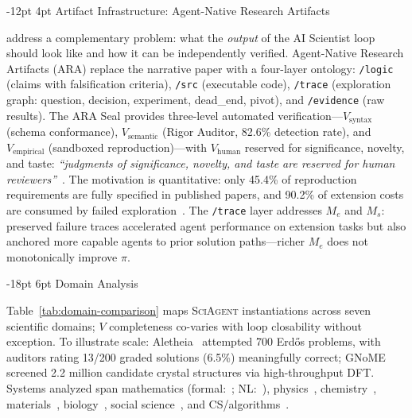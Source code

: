\documentclass[11pt]{article}
\makeatletter
\renewcommand\section{\@startsection{section}{1}{\z@}%
  {-18pt \@plus -4pt \@minus -2pt}%
  {6pt \@plus 2pt}%
  {\normalfont\large\bfseries}}
\renewcommand\subsection{\@startsection{subsection}{2}{\z@}%
  {-12pt \@plus -2pt \@minus -2pt}%
  {4pt \@plus 1pt}%
  {\normalfont\normalsize\bfseries}}
\newcommand{\framework}{\textsc{SciAgent}}
\makeatother
\begin{document}
\subsection{Artifact Infrastructure: Agent-Native Research Artifacts}
\label{sec:ara}

\citet{liu2026lasthuman} address a complementary problem: what the \emph{output} of the AI Scientist loop should look like and how it can be independently verified. Agent-Native Research Artifacts (ARA) replace the narrative paper with a four-layer ontology: \texttt{/logic} (claims with falsification criteria), \texttt{/src} (executable code), \texttt{/trace} (exploration graph: question, decision, experiment, dead\_end, pivot), and \texttt{/evidence} (raw results). The ARA Seal provides three-level automated verification---$V_\text{syntax}$ (schema conformance), $V_\text{semantic}$ (Rigor Auditor, 82.6\% detection rate), and $V_\text{empirical}$ (sandboxed reproduction)---with $V_\text{human}$ reserved for significance, novelty, and taste: \textit{``judgments of significance, novelty, and taste are reserved for human reviewers''}~\citep{liu2026lasthuman}. The motivation is quantitative: only 45.4\% of reproduction requirements are fully specified in published papers, and 90.2\% of extension costs are consumed by failed exploration~\citep{liu2026lasthuman}. The \texttt{/trace} layer addresses $M_e$ and $M_s$: preserved failure traces accelerated agent performance on extension tasks but also anchored more capable agents to prior solution paths---richer $M_e$ does not monotonically improve $\pi$.

\section{Domain Analysis}
\label{sec:domains}

Table~\ref{tab:domain-comparison} maps \framework{} instantiations across seven scientific domains; $V$ completeness co-varies with loop closability without exception. To illustrate scale: Aletheia~\citep{google2026aletheia} attempted 700 Erd\H{o}s problems, with auditors rating 13/200 graded solutions (6.5\%) meaningfully correct; GNoME~\citep{merchant2023gnome} screened 2.2 million candidate crystal structures via high-throughput DFT. Systems analyzed span mathematics (formal:~\citep{romera2023funsearch,xin2024deepseek}; NL:~\citep{google2026aletheia}), physics~\citep{udrescu2020afeynman,cranmer2020symbolic}, chemistry~\citep{bran2023chemcrow,sprueill2024chemreasoner}, materials~\citep{merchant2023gnome}, biology~\citep{odonoghue2023bioplanner}, social science~\citep{manning2024automated,aher2023turing,park2023generative}, and CS/algorithms~\citep{real2020automlzero,sartori2024algodiscovery,jaber2026autokernel}.
\end{document}
